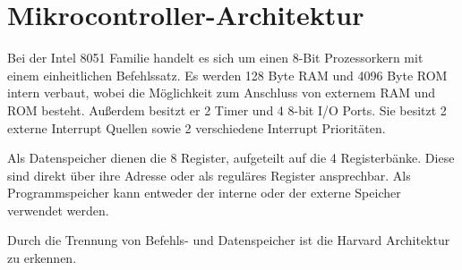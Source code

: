 
\chapter{Mikrocontroller-Architektur}\label{mikrocontroller-architektur}

Bei der Intel 8051 Familie handelt es sich um einen 8-Bit Prozessorkern
mit einem einheitlichen Befehlssatz. Es werden 128 Byte \ac{RAM} und
4096 Byte \ac{ROM} intern verbaut, wobei die Möglichkeit zum Anschluss
von externem \ac{RAM} und \ac{ROM} besteht. Außerdem besitzt er 2 Timer
und 4 8-bit \ac{I/O} Ports. Sie besitzt 2 externe Interrupt Quellen
sowie 2 verschiedene Interrupt Prioritäten.

Als Datenspeicher dienen die 8 Register, aufgeteilt auf die 4
Registerbänke. Diese sind direkt über ihre Adresse oder als reguläres
Register ansprechbar. Als Programmspeicher kann entweder der interne
oder der externe Speicher verwendet werden.

Durch die Trennung von Befehls- und Datenspeicher ist die Harvard
Architektur zu erkennen.
